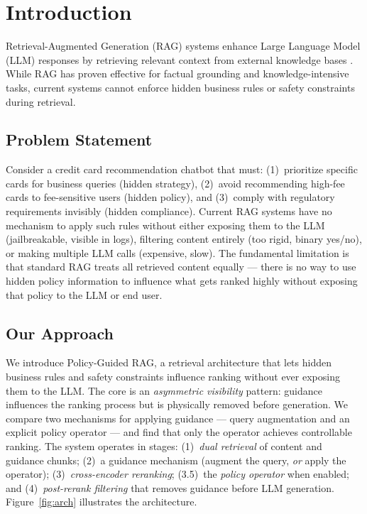 \documentclass[11pt]{article}
\begin{document}
\section{Introduction}
Retrieval-Augmented Generation (RAG) systems enhance Large Language Model (LLM) responses by
retrieving relevant context from external knowledge bases \citep{lewis2020rag,guu2020realm}.
While RAG has proven effective for factual grounding and knowledge-intensive tasks, current
systems cannot enforce hidden business rules or safety constraints during retrieval.

\subsection{Problem Statement}
Consider a credit card recommendation chatbot that must: (1)~prioritize specific cards for
business queries (hidden strategy), (2)~avoid recommending high-fee cards to fee-sensitive
users (hidden policy), and (3)~comply with regulatory requirements invisibly (hidden
compliance). Current RAG systems have no mechanism to apply such rules without either
exposing them to the LLM (jailbreakable, visible in logs), filtering content entirely (too
rigid, binary yes/no), or making multiple LLM calls (expensive, slow). The fundamental
limitation is that standard RAG treats all retrieved content equally --- there is no way to
use hidden policy information to influence what gets ranked highly without exposing that
policy to the LLM or end user.

\subsection{Our Approach}
We introduce Policy-Guided RAG, a retrieval architecture that lets hidden business rules and
safety constraints influence ranking without ever exposing them to the LLM. The core is an
\emph{asymmetric visibility} pattern: guidance influences the ranking process but is physically
removed before generation. We compare two mechanisms for applying guidance --- query
augmentation and an explicit policy operator --- and find that only the operator achieves
controllable ranking. The system operates in stages: (1)~\emph{dual retrieval} of content and
guidance chunks; (2)~a guidance mechanism (augment the query, \emph{or} apply the operator);
(3)~\emph{cross-encoder reranking}; (3.5)~the \emph{policy operator} when enabled; and
(4)~\emph{post-rerank filtering} that removes guidance before LLM generation.
Figure~\ref{fig:arch} illustrates the architecture.
\end{document}
